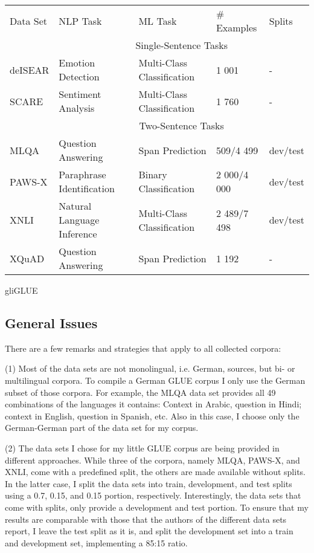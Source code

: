 {\begin{tabular}{l|llll}
	Data Set & NLP Task & ML Task & \# Examples & Splits \\
	\hhline{=|====}
	& \multicolumn{4}{|c}{Single-Sentence Tasks} \\
	deISEAR &  Emotion Detection & Multi-Class Classification  & 1 001 & - \\
	SCARE & Sentiment Analysis & Multi-Class Classification & 1 760 & - \\
	\hline
	& \multicolumn{4}{|c}{Two-Sentence Tasks} \\
	MLQA & Question Answering & Span Prediction & 509/4 499 & dev/test \\
	PAWS-X & Paraphrase Identification & Binary Classification & 2 000/4 000 & dev/test \\
	XNLI & Natural Language Inference & Multi-Class Classification &  2 489/7 498 & dev/test \\
	XQuAD & Question Answering & Span Prediction &  1 192 & - \\
\end{tabular}
}{gliGLUE}

\subsection{General Issues}

There are a few remarks and strategies that apply to all collected corpora:

(1) Most of the data sets are not monolingual, i.e. German, sources, but bi- or multilingual corpora.
To compile a German GLUE corpus I only use the German subset of those corpora.
For example, the MLQA data set provides all 49 combinations of the languages it contains:
Context in Arabic, question in Hindi; context in English, question in Spanish, etc.
Also in this case, I choose only the German-German part of the data set for my corpus.

(2) The data sets I chose for my little GLUE corpus are being provided in different approaches.
While three of the corpora, namely MLQA, PAWS-X, and XNLI, come with a predefined split, the others are made available without splits.
In the latter case, I split the data sets into train, development, and test splits using a 0.7, 0.15, and 0.15 portion, respectively.
Interestingly, the data sets that come with splits, only provide a development and test portion.
To ensure that my results are comparable with those that the authors of the different data sets report, I leave the test split as it is, and split the development set into a train and development set, implementing a 85:15 ratio.

